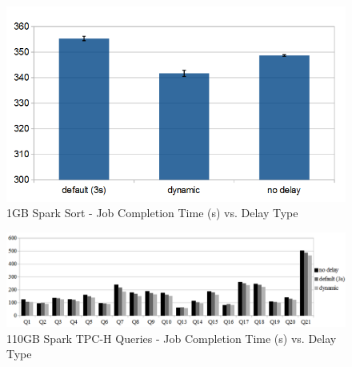 \begin{figure}[t]
        \includegraphics[width=\linewidth]{./smallscale.png}
        \caption{1GB Spark Sort - Job Completion Time (s) vs. Delay Type}
        \label{fig:smallscale}
    \endminipage \hfill
\end{figure}

\begin{figure}[t]
    \minipage{\textwidth}
        \includegraphics[width=\linewidth]{./TPCH.png}
        \caption{110GB Spark TPC-H Queries - Job Completion Time (s) vs. Delay Type}
        \label{fig:largescale}
    \endminipage \hfill
\end{figure}

